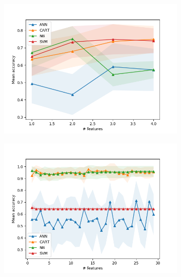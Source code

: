 \begin{figure}[htbp]
  \centering
  \begin{subfigure}[b]{0.475\textwidth}
      \centering
      \includegraphics[width=\textwidth]{../plots_with_std_fill/Cleaned_data_chi2_combined.png}
      \caption[]%
      {{\small}}
      \label{fig:EN_chi2}
  \end{subfigure}
  \hfill
  \begin{subfigure}[b]{0.475\textwidth}
      \centering
      \includegraphics[width=\textwidth]{../plots_with_std_fill/data_FNA_chi2_combined.png}
      \caption[]%
      {{\small}}
      \label{fig:WBCD_chi2}
  \end{subfigure}


\end{figure}
